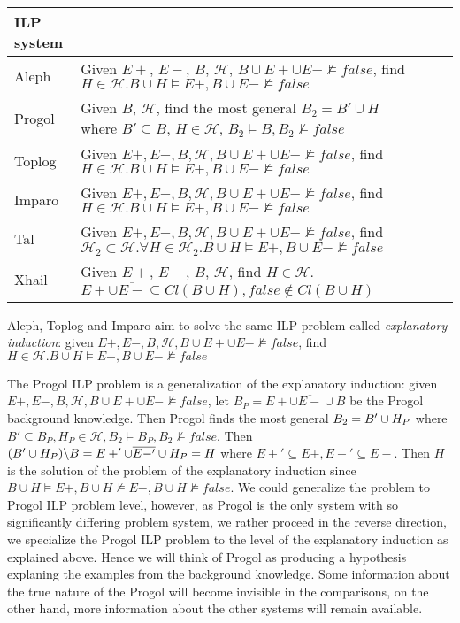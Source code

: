 \begin{center}
    \begin{tabular}{ | l | p{15cm} | l | p{5cm} |}
    \hline
    ILP system & \\ \hline
    Aleph & Given $E+$, $E-$, $B$, $\mathcal{H}$, $B \cup E+ \cup E- \not\models false$, find $H \in \mathcal{H}. B \cup H \models E+, B \cup E- \not\models false$\\ \hline
    Progol & Given $B$, $\mathcal{H}$, find the most general $B_2 = B' \cup H$ where $B' \subseteq B$, $H \in \mathcal{H}$, $B_2 \models B, B_2 \not\models false$\\ \hline
    Toplog & Given $E+, E-, B, \mathcal{H}, B \cup E+ \cup E- \not\models false$, find $H \in \mathcal{H}. B \cup H \models E+, B \cup E- \not\models false$ \\ \hline
    Imparo & Given $E+, E-, B, \mathcal{H}, B \cup E+ \cup E- \not\models false$, find $H \in \mathcal{H}. B \cup H \models E+, B \cup E- \not\models false$ \\ \hline
    Tal & Given $E+, E-, B, \mathcal{H}, B \cup E+ \cup E- \not\models false$, find $\mathcal{H}_2 \subset \mathcal{H}. \forall H \in \mathcal{H}_2. B \cup H \models E+, B \cup E- \not\models false$ \\ \hline
    Xhail & Given $E+$, $E-$, $B$, $\mathcal{H}$, find $H \in \mathcal{H}$. $E+ \cup \overline{E-} \subseteq Cl(B \cup H), false \not\in Cl(B \cup H)$\\ \hline
    \hline
    \end{tabular}
\end{center}

Aleph, Toplog and Imparo aim to solve the same ILP problem called \emph{explanatory induction}:
given $E+, E-, B, \mathcal{H}, B \cup E+ \cup E- \not\models false$, find $H \in \mathcal{H}. B \cup H \models E+, B \cup E- \not\models false$

The Progol ILP problem is a generalization of the explanatory induction: given $E+, E-, B, \mathcal{H}, B \cup E+ \cup E- \not\models false$,
let $B_P=E+ \cup \overline{E-} \cup B$ be the Progol background knowledge. Then Progol finds the most general $B_2 = B' \cup H_P$ where $B' \subseteq B_P, H_P \in \mathcal{H}, B_2 \models B_P, B_2 \not\models false$.
Then $(B' \cup H_P) \backslash B=E+' \cup \overline{E-'} \cup H_P = H$ where $E+' \subseteq E+, E-' \subseteq E-$. Then $H$ is the solution of the problem of the explanatory induction since $B \cup H \models E+, B \cup H \not\models E-, B \cup H \not\models false$. We could generalize the problem to Progol ILP problem level, however, as Progol is the only system with so significantly differing problem system, we rather proceed in the reverse direction, we specialize the Progol ILP problem to the level of the explanatory induction as explained above. Hence we will think of Progol as producing a hypothesis explaning the examples from the background knowledge. Some information about the true nature of the Progol will become invisible in the comparisons, on the other hand, more information about the other systems will remain available.

